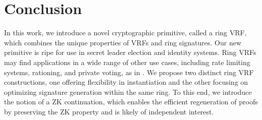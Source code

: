 


\section{Conclusion}\label{sec:conclusion}

In this work, we introduce a novel cryptographic primitive, called a ring VRF, which combines the unique properties of VRFs  and ring signatures. Our new primitive is ripe for use in secret leader election and identity systems.  Ring VRFs may find applications in a wide range of other use cases, including rate limiting systems, rationing, and private voting, as in \cite{Semaphore}. We propose two distinct ring VRF constructions, one offering flexibility in instantiation and the other focusing on optimizing signature generation within the same ring. To this end, we introduce the notion of a ZK continuation, which enables the efficient regeneration of proofs by preserving the ZK property and is likely of independent interest.

